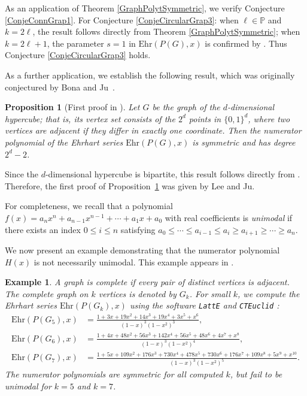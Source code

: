 \documentclass[reqno, 12pt]{amsart}
\newtheorem{prop}[thm]{Proposition}
\theoremstyle{mydefinition}
\theoremstyle{myremark}
\newtheorem{exa}[thm]{Example}
\begin{document}
As an application of Theorem \ref{GraphPolytSymmetric}, we verify Conjecture \ref{ConjeConnGrap1}. For Conjecture \ref{ConjeCircularGrap3}: when $\ell \in \mathbb{P}$ and $k=2\ell$, the result follows directly from Theorem \ref{GraphPolytSymmetric}; when $k=2\ell+1$, the parameter $s=1$ in $\mathrm{Ehr}(P(G),x)$ is confirmed by \cite{XinZhongZhou}. Thus Conjecture \ref{ConjeCircularGrap3} holds.

As a further application, we establish the following result, which was originally conjectured by Bona and Ju~\cite[Section 2.6]{BonaJu07}.

\begin{prop}[First proof in \cite{LeeJu15}]\label{ConjeHyperGrap2}
Let $G$ be the graph of the $d$-dimensional hypercube; that is, its vertex set consists of the $2^d$ points in $\{0,1\}^d$, where two vertices are adjacent if they differ in exactly one coordinate.
Then the numerator polynomial of the Ehrhart series $\mathrm{Ehr}(P(G),x)$ is symmetric and has degree $2^d - 2$.
\end{prop}

Since the $d$-dimensional hypercube is bipartite, this result follows directly from \cite[Theorem 5]{LeeJu15}. Therefore, the first proof of Proposition~\ref{ConjeHyperGrap2} was given by Lee and Ju.

For completeness, we recall that a polynomial $f(x)=a_nx^n+a_{n-1}x^{n-1}+\cdots+a_1x+a_0$ with real coefficients is \emph{unimodal} if there exists an index $0 \leq i \leq n$ satisfying $a_0\leq \cdots \leq a_{i-1}\leq a_i\geq a_{i+1} \geq \cdots \geq a_n$.

We now present an example demonstrating that the numerator polynomial $H(x)$ is not necessarily unimodal. This example appears in \cite[Theorem 2.5]{BonaJu07}.

\begin{exa}
A graph is \emph{complete} if every pair of distinct vertices is adjacent. The complete graph on $k$ vertices is denoted by $G_k$. For small $k$, we compute the Ehrhart series $\mathrm{Ehr}(P(G_k),x)$ using the software \emph{\texttt{LattE}} \cite{DeLoera04} and \emph{\texttt{CTEuclid}} \cite{Xin15}:
{\small
\begin{align*}
\mathrm{Ehr}(P(G_5),x) &= \frac{1+3x+19x^2+14x^3+19x^4+3x^5+x^6}{(1-x)^3(1-x^2)^3}, \\
\mathrm{Ehr}(P(G_6),x) &= \frac{1+4x+48x^2+56x^3+142x^4+56x^5+48x^6+4x^7+x^8}{(1-x)^3(1-x^2)^4}, \\
\mathrm{Ehr}(P(G_7),x) &= \frac{1+5x+109x^2+176x^3+730x^4+478x^5+730x^6+176x^7+109x^8+5x^9+x^{10}}{(1-x)^3(1-x^2)^5}.
\end{align*}}
The numerator polynomials are symmetric for all computed $k$, but fail to be unimodal for $k=5$ and $k=7$.
\end{exa}
\end{document}
